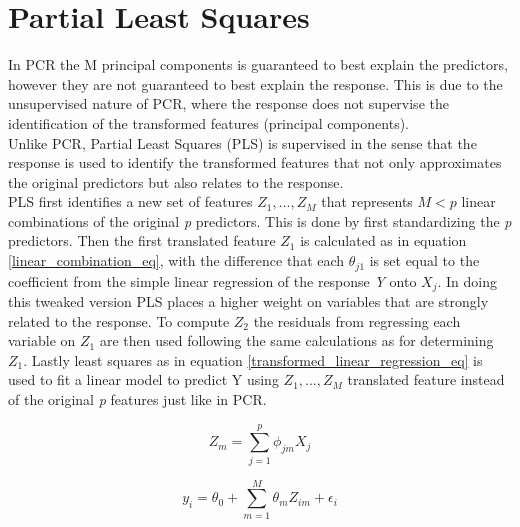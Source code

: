 \section{Partial Least Squares}
In PCR the M principal components is guaranteed to best explain the predictors, however they are not guaranteed to best explain the response. This is due to the unsupervised nature of PCR, where the response does not supervise the identification of the transformed features (principal components).\\
Unlike PCR, Partial Least Squares (PLS) is supervised in the sense that the response is used to identify the transformed features that not only approximates the original predictors but also relates to the response.\\
PLS first identifies a new set of features \(Z_1,...,Z_M\) that represents \(M < p\) linear combinations of the original \emph{p} predictors. This is done by first standardizing the \emph{p} predictors. Then the first translated feature \(Z_1\) is calculated as in equation \ref{linear_combination_eq}, with the difference that each \(\theta_{j1}\) is set equal to the coefficient from the simple linear regression of the response \emph{Y} onto \(X_j\). In doing this tweaked version PLS places a higher weight on variables that are strongly related to the response. To compute \(Z_2\) the residuals from regressing each variable on \(Z_1\) are then used following the same calculations as for determining \(Z_1\). Lastly least squares as in equation \ref{transformed_linear_regression_eq} is used to fit a linear model to predict Y using \(Z_1,...,Z_M\) translated feature instead of the original \emph{p} features just like in PCR.

\begin{equation}
Z_m = \sum_{j=1}^{p}\phi_{jm}X_j\label{linear_combination_eq}
\end{equation}

\begin{equation}
y_i = \theta_0 + \sum_{m=1}^{M}\theta_{m}Z_{im} + \epsilon_i\label{transformed_linear_regression_eq}
\end{equation}